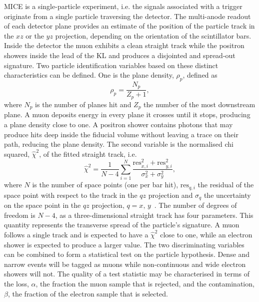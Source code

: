 MICE is a single-particle experiment, i.e. the signals associated with a trigger originate from a single particle traversing the detector. The multi-anode readout of each detector plane provides an estimate of the position of the particle track in the $xz$ or the $yz$ projection, depending on the orientation of the scintillator bars.
Inside the detector the muon exhibits a clean straight track while the positron showers inside the lead of the KL and produces a disjointed and spread-out signature. 
Two particle identification variables based on these distinct characteristics can be defined. One is the plane density, $\rho_p$, defined as
\begin{equation}
\rho_p = \frac{N_p}{Z_p+1},
\end{equation}
where $N_p$ is the number of planes hit and $Z_p$ the number of the most downstream plane. A muon deposits energy in every plane it crosses until it stops, producing a plane density close to one. A positron shower contains photons that may produce hits deep inside the fiducial volume without leaving a trace on their path, reducing the plane density. The second variable is the normalised chi squared, $\hat{\chi}^2$, of the fitted straight track, i.e.
\begin{equation}
\hat{\chi}^2=\frac{1}{N-4}\sum_{i=1}^{N}\frac{\text{res}_{x,i}^2+\text{res}_{y,i}^2}{\sigma_x^2+\sigma_y^2},
\end{equation}
where $N$ is the number of space points (one per bar hit), $\text{res}_{q,i}$ the residual of the space point with respect to the track in the $qz$ projection and $\sigma_q$ the uncertainty on the space point in the $qz$ projection, $q=x,\,y$~\cite{Drielsma:thesis}. The number of degrees of freedom is $N-4$, as a three-dimensional straight track has four parameters. This quantity represents the transverse spread of the particle's signature. A muon follows a single track and is expected to have a $\hat{\chi}^2$ close to one, while an electron shower is expected to produce a larger value.
The two discriminating variables can be combined to form a statistical test on the particle hypothesis.
Dense and narrow events will be tagged as muons while non-continuous and wide electron showers will not. 
The quality of a test statistic may be characterised in terms of the loss, $\alpha$, the fraction the muon sample that is rejected, and the contamination, $\beta$, the fraction of the electron sample that is selected.

